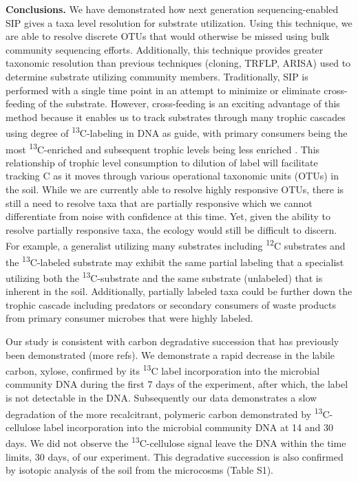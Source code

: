 \textbf{Conclusions.} We have demonstrated how next generation sequencing-enabled SIP gives a taxa level resolution for substrate utilization. Using this technique, we are able to resolve discrete OTUs that would otherwise be missed using bulk community sequencing efforts. Additionally, this technique provides greater taxonomic resolution than previous techniques (cloning, TRFLP, ARISA) used to determine substrate utilizing community members. Traditionally, SIP is performed with a single time point in an attempt to minimize or eliminate cross-feeding of the substrate. However, cross-feeding is an exciting advantage of this method because it enables us to track substrates through many trophic cascades using degree of \textsuperscript{13}C-labeling in DNA as guide, with primary consumers being the most \textsuperscript{13}C-enriched and subsequent trophic levels being less enriched \cite{Morris_2002,McDonald_2005,Ziegler_2005}. This relationship of trophic level consumption to dilution of label will facilitate tracking C as it moves through various operational taxonomic units (OTUs) in the soil. While we are currently able to resolve highly responsive OTUs, there is still a need to resolve taxa that are partially responsive which we cannot differentiate from noise with confidence at this time. Yet, given the ability to resolve partially responsive taxa, the ecology would still be difficult to discern. For example, a generalist utilizing many substrates including \textsuperscript{12}C substrates and the \textsuperscript{13}C-labeled substrate may exhibit the same partial labeling that a specialist utilizing both the \textsuperscript{13}C-substrate and the same substrate (unlabeled) that is inherent in the soil. Additionally, partially labeled taxa could be further down the trophic cascade including predators or secondary consumers of waste products from primary consumer microbes that were highly labeled.   

Our study is consistent with carbon degradative succession that has previously been demonstrated \cite{Bastian_2009} (more refs). We demonstrate a rapid decrease in the labile carbon, xylose, confirmed by its \textsuperscript{13}C label incorporation into the microbial community DNA during the first 7 days of the experiment, after which, the label is not detectable in the DNA. Subsequently our data demonstrates a slow degradation of the more recalcitrant, polymeric carbon demonstrated by \textsuperscript{13}C-cellulose label incorporation into the microbial community DNA at 14 and 30 days. We did not observe the \textsuperscript{13}C-cellulose signal leave the DNA within the time limits, 30 days, of our experiment. This degradative succession is also confirmed by isotopic analysis of the soil from the microcosms (Table S1). 

